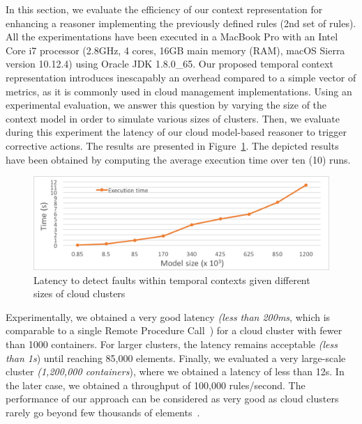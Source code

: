 In this section, we evaluate the efficiency of our context representation for enhancing a reasoner implementing the previously defined rules (2nd set of rules).
All the experimentations have been executed in a MacBook Pro with an Intel Core i7 processor (2.8GHz, 4 cores, 16GB main memory (RAM), macOS Sierra version 10.12.4) using Oracle JDK 1.8.0\_65.
Our proposed temporal context representation introduces inescapably an overhead compared to a simple vector of metrics, as it is commonly used in cloud management implementations.
Using an experimental evaluation, we answer this question by varying the size of the context model in order to simulate various sizes of clusters.
Then, we evaluate during this experiment the latency of our cloud model-based reasoner to trigger corrective actions.
The results are presented in Figure~\ref{fig:eval_latency}.
The depicted results have been obtained by computing the average execution time over ten (10) runs.

\begin{figure}
	\centering
	\includegraphics[width=\linewidth]{img/chapt-tkm/validation/latency-eval.png}
	\caption{Latency to detect faults within temporal contexts given different sizes of cloud clusters}
	\label{fig:eval_latency}
\end{figure}

Experimentally, we obtained a very good latency \textit{(less than 200ms}, which is comparable to a single Remote Procedure Call~\cite{mulligan2009comparison}) for a cloud cluster with fewer than 1000 containers. 
For larger clusters, the latency remains acceptable \textit{(less than 1s}) until reaching 85,000 elements. 
Finally, we evaluated a very large-scale cluster \textit{(1,200,000 containers}), where we obtained a latency of less than 12s.
In the later case, we obtained a throughput of 100,000 rules/second.
The performance of our approach can be considered as very good as cloud clusters rarely go beyond few thousands of elements~\cite{DBLP:conf/ccgrid/ShenBI15}.

